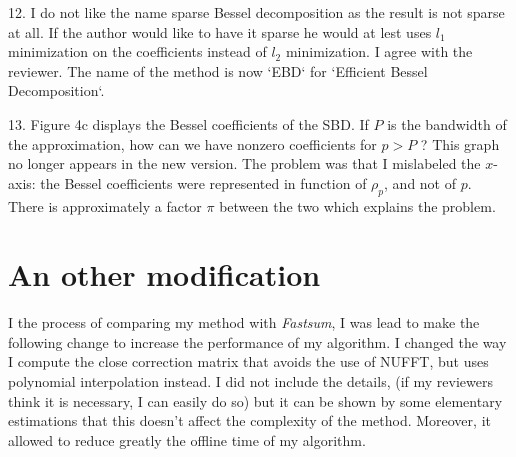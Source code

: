 \documentclass[10pt]{article}
\begin{document}
\begin{response}
	{12. I do not like the name sparse Bessel decomposition as the result is not sparse at all. If the author would like to have it sparse he would at lest uses $l_1$ minimization on the coefficients instead of $l_2$ minimization.}
	I agree with the reviewer. The name of the method is now `EBD` for `Efficient Bessel Decomposition`. 
\end{response}
\begin{response}
	{13. Figure 4c displays the Bessel coefficients of the SBD. If $P$ is the bandwidth of the approximation, how can we have nonzero coefficients for $p > P$ ?}
	This graph no longer appears in the new version. The problem was that I mislabeled the $x$-axis: the Bessel coefficients were represented in function of $\rho_p$, and not of $p$. There is approximately a factor $\pi$ between the two which explains the problem. 
\end{response}
\section*{An other modification}

I the process of comparing my method with \textit{Fastsum}, I was lead to make the following change to increase the performance of my algorithm. I changed the way I compute the close correction matrix that avoids the use of NUFFT, but uses polynomial interpolation instead. I did not include the details, (if my reviewers think it is necessary, I can easily do so) but it can be shown by some elementary estimations that this doesn't affect the complexity of the method. Moreover, it allowed to reduce greatly the offline time of my algorithm. 

	
	
\end{document}
